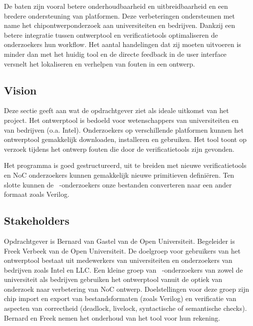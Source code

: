 De baten zijn vooral betere onderhoudbaarheid en uitbreidbaarheid en een bredere ondersteuning van platformen.
Deze verbeteringen ondersteunen met name het chipontwerponderzoek aan universiteiten en bedrijven. Dankzij 
een betere integratie tussen ontwerptool en verificatietools optimaliseren de onderzoekers hun workflow. 
Het aantal handelingen dat zij moeten uitvoeren is minder dan met het huidig tool en de directe feedback 
in de user interface versnelt het lokaliseren en verhelpen van fouten in een ontwerp.

\subsection{Vision}\label{sec: vision}

Deze sectie geeft aan wat de opdrachtgever ziet als ideale uitkomst van het project. Het ontwerptool is
bedoeld voor wetenschappers van universiteiten en van bedrijven (o.a. Intel). Onderzoekers op verschillende
platformen kunnen het ontwerptool gemakkelijk downloaden, installeren en gebruiken. Het tool toont op verzoek
tijdens het ontwerp fouten die door de verificatietools zijn gevonden.

Het programma is goed gestructureerd, uit te breiden met nieuwe verificatietools en NoC onderzoekers
kunnen gemakkelijk nieuwe primitieven defini\"eren. Ten slotte kunnen de \xmas\ -onderzoekers onze bestanden
converteren naar een ander formaat zoals Verilog.

\subsection{Stakeholders}

Opdrachtgever is Bernard van Gastel van de Open Universiteit. Begeleider is Freek Verbeek van de Open Universiteit.
De doelgroep voor gebruikers van het ontwerptool bestaat uit medewerkers van universiteiten en onderzoekers van bedrijven zoals
Intel en LLC. Een kleine groep van \xmas\ -onderzoekers van zowel de universiteit als bedrijven gebruiken het ontwerptool
vanuit de optiek van onderzoek naar verbetering van NoC ontwerp. Doelstellingen voor deze groep zijn chip import
en export van bestandsformaten (zoals Verilog) en verificatie van aspecten van correctheid (deadlock, livelock,
syntactische of semantische checks). Bernard en Freek nemen het onderhoud van het tool voor hun rekening.


